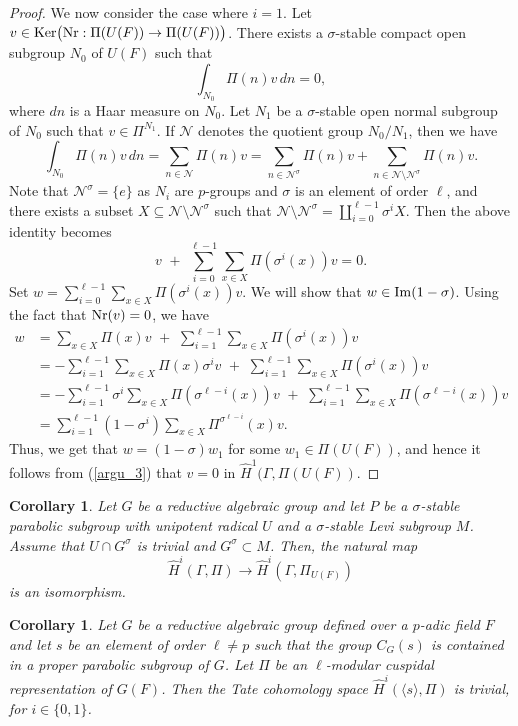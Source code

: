 \documentclass[10pt, reqno]{amsart}
\theoremstyle{plain}
\numberwithin{equation}{section}
\newtheorem{corollary}[theorem]{Corollary}
\begin{document}
\begin{proof}
We now consider the case where $i=1$. 
Let $v\in {\rm Ker}\big({\rm Nr}:\Pi(U(F))\rightarrow \Pi(U(F))\big)$. There 
exists a $\sigma$-stable compact open subgroup $N_0$ of $U(F)$ such that
$$ \int_{N_0} \Pi(n)v\,dn = 0, $$
where $dn$ is a Haar measure on $N_0$. Let $N_1$ be a $\sigma$-stable
open normal subgroup of $N_0$ such that $v\in \Pi^{N_1}$. If
$\mathcal{N}$ denotes the quotient group $N_0/N_1$, then we have
$$ \int_{N_0} \Pi(n)v\,dn = \sum_{n\in \mathcal{N}} \Pi(n)v 
= \sum_{n\in \mathcal{N}^\sigma}\Pi(n)v + \sum_{n\in \mathcal{N}\setminus 
\mathcal{N}^\sigma}\Pi(n)v. $$
Note that $\mathcal{N}^\sigma = \{e\}$ as $N_i$ are $p$-groups and $\sigma$ 
is an element of order $\ell$, and there exists a subset $X\subseteq 
\mathcal{N}\setminus \mathcal{N}^\sigma$ such that $\mathcal{N}\setminus 
\mathcal{N}^\sigma = \coprod_{i=0}^{\ell-1}\sigma^iX$. Then the above 
identity becomes
\begin{equation}\label{argu_3}
v \,\,+ \,\,\sum_{i=0}^{\ell-1}\sum_{x\in X}\Pi(\sigma^i(x))v = 0.
\end{equation}
Set $w = \sum_{i=0}^{\ell-1}\sum_{x\in X}\Pi(\sigma^i(x))v$. We will show 
that $w\in {\rm Im}(1-\sigma)$. Using the fact that ${\rm Nr}(v) = 0$, we have
\begin{align*}
w 
&= \sum_{x\in X}\Pi(x)v \,\,+\,\, \sum_{i=1}^{\ell-1}\sum_{x\in X} \Pi(\sigma^i(x))v\\
&= -\sum_{i=1}^{\ell-1}\sum_{x\in X}
\Pi(x)\sigma^{i}v \,\,+\,\, \sum_{i=1}^{\ell-1}\sum_{x\in X} \Pi(\sigma^i(x)) v\\
&= -\sum_{i=1}^{\ell-1}\sigma^i\sum_{x\in X} \Pi(\sigma^{\ell-i}(x))v 
\,\,+\,\, \sum_{i=1}^{\ell-1}\sum_{x\in X}
\Pi(\sigma^{\ell-i}(x)) v\\
&= \sum_{i=1}^{\ell-1}(1-\sigma^i)\sum_{x\in X}\Pi^{\sigma^{\ell-i}}(x)v.
\end{align*}
Thus, we get that $w = (1-\sigma)w_1$ for some $w_1\in \Pi(U(F))$, and
hence it follows from (\ref{argu_3}) that $v = 0$ in
$\widehat{H}^1(\Gamma, \Pi(U(F))$.
\end{proof}
\begin{corollary}
  Let $G$ be a reductive algebraic group and let $P$ be a
  $\sigma$-stable parabolic subgroup with unipotent radical $U$ and a
  $\sigma$-stable Levi subgroup $M$. Assume that $U\cap G^\sigma$ is
  trivial and $G^\sigma\subset M$.  Then, the natural map
     $$\widehat{H}^i(\Gamma, \Pi)\rightarrow \widehat{H}^i(\Gamma, \Pi_{U(F)})$$
     is an isomorphism. 
\end{corollary}
\begin{corollary}
  Let $G$ be a reductive algebraic group defined over a $p$-adic field
  $F$ and let $s$ be an element of order $\ell\neq p$ such that the
  group $C_G(s)$ is contained in a proper parabolic subgroup of $G$.
  Let $\Pi$ be an $\ell$-modular cuspidal representation of
  $G(F)$. Then the Tate cohomology space
  $\widehat{H}^i(\langle s\rangle, \Pi)$ is trivial, for
  $i\in \{0,1\}$.
\end{corollary}
\end{document}

